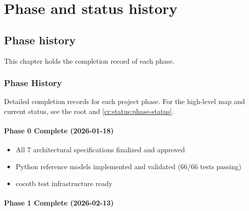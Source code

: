 \part{Phase and status history}\label{cr:part:phase-and-status-history}

\chapter{Phase history}\label{cr:ch:phase-history}

This chapter holds the completion record of each phase.

\section{Phase History}\label{cr:status:phase-history}

\begin{record}

Detailed completion records for each project phase. For the high-level
map and current status, see the root  and
\cref{cr:status:phase-status}.

\end{record}

\subsection{\texorpdfstring{Phase 0 Complete \ok{}
(2026-01-18)}{Phase 0 Complete  (2026-01-18)}}\label{cr:status:phase-history:phase-0-complete-white-check-mark-2026-01-18}

\begin{record}

\begin{itemize}
\tightlist
\item
  \ok{} All 7 architectural specifications finalized and approved
\item
  \ok{} Python reference models implemented and validated (66/66 tests
  passing)
\item
  \ok{} cocotb test infrastructure ready
\end{itemize}

\end{record}

\subsection{\texorpdfstring{Phase 1 Complete \ok{}
(2026-02-13)}{Phase 1 Complete  (2026-02-13)}}\label{cr:status:phase-history:phase-1-complete-white-check-mark-2026-02-13}

